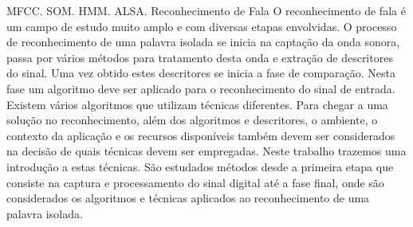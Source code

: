 \begin{resumo}{MFCC. SOM. HMM. ALSA. Reconhecimento de Fala}
\label{sec:resumo}
O reconhecimento de fala é um campo de estudo muito amplo e com diversas etapas envolvidas. O processo de reconhecimento de uma palavra isolada se inicia na captação da onda sonora, passa por vários métodos para tratamento desta onda e extração de descritores do sinal. Uma vez obtido estes descritores se inicia a fase de comparação. Nesta fase um algoritmo deve ser aplicado para o reconhecimento do sinal de entrada. Existem vários algoritmos que utilizam técnicas diferentes. Para chegar a uma solução no reconhecimento, além dos algoritmos e descritores, o ambiente, o contexto da aplicação e os recursos disponíveis também devem ser considerados na decisão de quais técnicas devem ser empregadas. Neste trabalho trazemos uma introdução a estas técnicas. São estudados métodos desde a primeira etapa que consiste na captura e processamento do sinal digital até a fase final, onde são considerados os algoritmos e técnicas aplicados ao reconhecimento de uma palavra isolada.
\end{resumo}
\begin{abstract}{MFCC. HMM. Alsa. Speech Recognition}
\label{sec:abstract}
Speech recognition is a very broad field of study and with several steps involved. The recognition process of an isolated word starts in the capture of the sound wave passes through several methods for the treatment of this wave signal and extracting features. Once obtained these features starts the comparison phase. At this stage an algorithm must be applied to the recognition of the input signal. There are several algorithms that use different techniques. To get a solution in addition to the recognition algorithms and features extraction, the environment, the application context and the resources available should also be considered in deciding which techniques should be employed. In this paper we bring an introduction to these techniques. The methods are studied from the first step of the capture and digital signal processing to the final stage, which are considered the algorithms and techniques applied to the recognition of a isolated word.
\end{abstract}